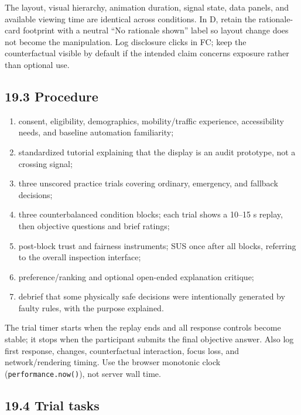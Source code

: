 \documentclass[
  english,
  11pt,
  a4paper,
]{article}
\providecommand{\tightlist}{%
  \setlength{\itemsep}{0pt}\setlength{\parskip}{0pt}}
\begin{document}
The layout, visual hierarchy, animation duration, signal state, data
panels, and available viewing time are identical across conditions. In
D, retain the rationale-card footprint with a neutral ``No rationale
shown'' label so layout change does not become the manipulation. Log
disclosure clicks in FC; keep the counterfactual visible by default if
the intended claim concerns exposure rather than optional use.

\subsection{19.3 Procedure}\label{procedure}

\begin{enumerate}
\def\labelenumi{\arabic{enumi}.}
\tightlist
\item
  consent, eligibility, demographics, mobility/traffic experience,
  accessibility needs, and baseline automation familiarity;
\item
  standardized tutorial explaining that the display is an audit
  prototype, not a crossing signal;
\item
  three unscored practice trials covering ordinary, emergency, and
  fallback decisions;
\item
  three counterbalanced condition blocks; each trial shows a 10--15 s
  replay, then objective questions and brief ratings;
\item
  post-block trust and fairness instruments; SUS once after all blocks,
  referring to the overall inspection interface;
\item
  preference/ranking and optional open-ended explanation critique;
\item
  debrief that some physically safe decisions were intentionally
  generated by faulty rules, with the purpose explained.
\end{enumerate}

The trial timer starts when the replay ends and all response controls
become stable; it stops when the participant submits the final objective
answer. Also log first response, changes, counterfactual interaction,
focus loss, and network/rendering timing. Use the browser monotonic
clock (\texttt{performance.now()}), not server wall time.

\subsection{19.4 Trial tasks}\label{trial-tasks}
\end{document}
